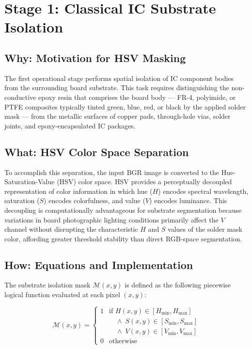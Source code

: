 \documentclass[12pt,a4paper]{report}
\begin{document}
\section{Stage 1: Classical IC Substrate Isolation}
\label{sec:stage1}

\subsection{Why: Motivation for HSV Masking}
The first operational stage performs spatial isolation of IC component bodies from the surrounding board substrate. This task requires distinguishing the non-conductive epoxy resin that comprises the board body --- FR-4, polyimide, or PTFE composites typically tinted green, blue, red, or black by the applied solder mask --- from the metallic surfaces of copper pads, through-hole vias, solder joints, and epoxy-encapsulated IC packages.

\subsection{What: HSV Color Space Separation}
To accomplish this separation, the input BGR image is converted to the Hue-Saturation-Value (HSV) color space. HSV provides a perceptually decoupled representation of color information in which hue ($H$) encodes spectral wavelength, saturation ($S$) encodes colorfulness, and value ($V$) encodes luminance. This decoupling is computationally advantageous for substrate segmentation because variations in board photographic lighting conditions primarily affect the $V$ channel without disrupting the characteristic $H$ and $S$ values of the solder mask color, affording greater threshold stability than direct RGB-space segmentation.

\subsection{How: Equations and Implementation}
The substrate isolation mask $\mathcal{M}(x,y)$ is defined as the following piecewise logical function evaluated at each pixel $(x,y)$:

\begin{equation}
\label{eq:hsv_mask}
\mathcal{M}(x,y) =
\begin{cases}
1 & \text{if } H(x,y) \in [H_{\min}, H_{\max}] \\
  & \quad \land \; S(x,y) \in [S_{\min}, S_{\max}] \\
  & \quad \land \; V(x,y) \in [V_{\min}, V_{\max}] \\
0 & \text{otherwise}
\end{cases}
\end{equation}
\end{document}
